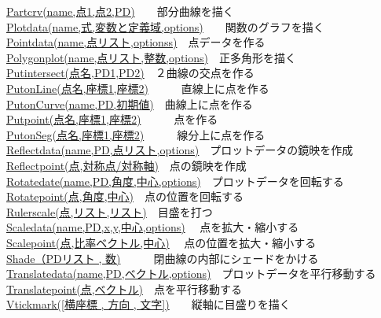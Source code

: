 \documentclass[papersize,a4paper,12pt,uplatex]{jsarticle}
\begin{document}
\begin{tabbing}
\hyperlink{partcrv}{Partcrv(name,点1,点2,PD)}　　\>部分曲線を描く\\
\hyperlink{plotdata}{Plotdata(name,式,変数と定義域,options)}　　\>関数のグラフを描く\\
\hyperlink{pointdata}{Pointdata(name,点リスト,optionss)}　\>点データを作る\\
\hyperlink{polygonplot}{Polygonplot(name,点リスト,整数,options)}　\>正多角形を描く\\
\hyperlink{putintersect}{Putintersect(点名,PD1,PD2)}　\>２曲線の交点を作る\\
\hyperlink{putline}{PutonLine(点名,座標1,座標2)}　　　\>直線上に点を作る\\
\hyperlink{putoncurve}{PutonCurve(name,PD,初期値)}　\>曲線上に点を作る\\
\hyperlink{putpoint}{Putpoint(点名,座標1,座標2)}　　　\>点を作る\\
\hyperlink{putseg}{PutonSeg(点名,座標1,座標2)}　　　\>線分上に点を作る\\
\hyperlink{reflectdata}{Reflectdata(name,PD,点リスト,options)}　\>プロットデータの鏡映を作成\\
\hyperlink{reflectpoint}{Reflectpoint(点,対称点/対称軸)}　\>点の鏡映を作成\\
\hyperlink{rotatedata}{Rotatedate(name,PD,角度,中心,options)}　\>プロットデータを回転する\\
\hyperlink{rotatepoint}{Rotatepoint(点,角度,中心)}　\>点の位置を回転する\\
\hyperlink{rulerscale}{Rulerscale(点,リスト,リスト)}　\>目盛を打つ\\
\hyperlink{scaldedata}{Scaledata(name,PD,x,y,中心,options)} 　\>点を拡大・縮小する\\
\hyperlink{scalepoint}{Scalepoint(点,比率ベクトル,中心)} 　\>点の位置を拡大・縮小する\\
\hyperlink{shade}{Shade（PDリスト , 数)}　　　\>閉曲線の内部にシェードをかける\\
\hyperlink{translatedata}{Translatedata(name,PD,ベクトル,options)}　\>プロットデータを平行移動する\\
\hyperlink{translatepoint}{Translatepoint(点,ベクトル)}　\>点を平行移動する\\
\hyperlink{vtickmark}{Vtickmark([横座標 , 方向 , 文字])}　　\>縦軸に目盛りを描く\\


\end{tabbing}
\end{document}
